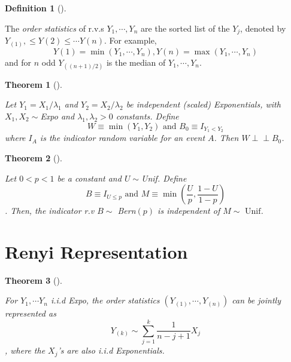 \documentclass[
  letterpaper,
  DIV=11,
  numbers=noendperiod]{scrreprt}
\theoremstyle{definition}
\newtheorem{definition}{Definition}[chapter]
\theoremstyle{plain}
\newtheorem{theorem}{Theorem}[chapter]
\theoremstyle{remark}
\begin{document}

\leavevmode{}%
\begin{definition}[]\label{def-poisson-process}

The \emph{order statistics} of r.v.s \(Y_1, \cdots, Y_n\) are the sorted
list of the \(Y_j\), denoted by
\(Y_{(1)}, \leq Y{(2)} \leq \cdots Y{(n)}\). For example,
\[Y{(1)} =\min(Y_1,\cdots, Y_n), Y{(n)}=\max(Y_1,\cdots, Y_n)\] and for
\(n\) odd \(Y_{((n+1)/2)}\) is the median of \(Y_1,\cdots, Y_n\).

\end{definition}

\leavevmode{}%
\begin{theorem}[]\label{thm-competing-risk}

Let \(Y_1 = X_1/\lambda_1\) and \(Y_2 = X_2/\lambda_2\) be independent
(scaled) Exponentials, with \(X_1,X_2 \sim\)Expo and
\(\lambda_1, \lambda_2 >0\) constants. Define
\[W\equiv\min(Y_1, Y_2) \text{ and } B_0\equiv I_{Y_1<Y_2}\] where
\(I_A\) is the indicator random variable for an event \(A\). Then
\(W \perp\!\!\!\perp B_0\).

\end{theorem}

\leavevmode{}%
\begin{theorem}[]\label{thm-lemma}

Let \(0<p<1\) be a constant and \(U\sim\)Unif. Define
\[B\equiv I_{U\leq p} \text{ and } M\equiv \min(\frac{U}{p}, \frac{1-U}{1-p})\].
Then, the indicator r.v \(B\sim\) Bern\((p)\) is independent of
\(M \sim \text{ Unif}\).

\end{theorem}

\hypertarget{renyi-representation}{%
\section*{Renyi Representation}\label{renyi-representation}}


\leavevmode{}%
\begin{theorem}[]\label{thm-renyi-representation}

For \(Y_1,\cdots Y_n\) i.i.d Expo, the \emph{order statistics}
\((Y_{(1)},\cdots, Y_{(n)})\) can be jointly represented as
\[Y_{(k)}\sim \sum_{j=1}^k \frac{1}{n-j+1} X_j\], where the \(X_j\)'s
are also i.i.d Exponentials.

\end{theorem}
\end{document}
